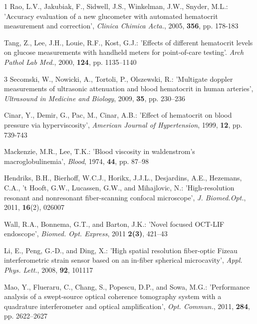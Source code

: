 \documentclass[twocolumn]{htl-author}
\begin{document}

\begin{thebibliography}{14}

 1  Rao, L.V., Jakubiak, F., Sidwell, J.S., Winkelman, J.W., Snyder, M.L.: 'Accuracy evaluation of a new glucometer with automated hematocrit measurement and correction', \textit{Clinica Chimica Acta.}, 2005, {\bf 356}, pp. 178-183

 Tang, Z., Lee, J.H., Louie, R.F., Kost, G.J.: 'Effects of different hematocrit levels on glucose measurements with handheld meters for point-of-care testing'. \emph{Arch Pathol Lab Med.}, 2000, {\bf 124}, pp. 1135--1140

 3  Secomski, W., Nowicki, A., Tortoli, P., Olszewski, R.: 'Multigate doppler measurements of ultrasonic attenuation and blood hematocrit in human arteries', \emph{Ultrasound in Medicine and Biology}, 2009, {\bf35}, pp. 230--236

 Cinar, Y., Demir, G., Pac, M., Cinar, A.B.: 'Effect of hematocrit on blood pressure via hyperviscosity', \emph{American Journal of Hypertension}, 1999, \textbf{12}, pp. 739-743

Mackenzie, M.R., Lee, T.K.: 'Blood viscosity in waldenstrom's macroglobulinemia', \emph{Blood}, 1974, \textbf{44}, pp. 87--98

 Hendriks, B.H., Bierhoff, W.C.J., Horikx, J.J.L., Desjardins, A.E., Hezemans, C.A., 't Hooft, G.W., Lucassen, G.W., and Mihajlovic, N.: 'High-resolution resonant and nonresonant fiber-scanning confocal microscope', \emph{J. Biomed.Opt.}, 2011, \textbf{16}(2), 026007

 Wall, R.A., Bonnema, G.T., and Barton, J.K.: 'Novel focused OCT-LIF endoscope', \emph{Biomed. Opt. Express}, 2011 \textbf{2(3)}, 421--43

 Li, E., Peng, G.-D., and Ding, X.: 'High spatial resolution fiber-optic Fizeau interferometric strain sensor based on an in-fiber spherical microcavity', \emph{Appl. Phys. Lett.}, 2008, \textbf{92}, 101117

 Mao, Y., Flueraru, C., Chang, S., Popescu, D.P., and Sowa, M.G.: 'Performance analysis of a swept-source optical coherence tomography system with a quadrature interferometer and optical amplification', \emph{Opt. Commun.}, 2011, \textbf{284}, pp. 2622--2627


\end{thebibliography}
\end{document}
